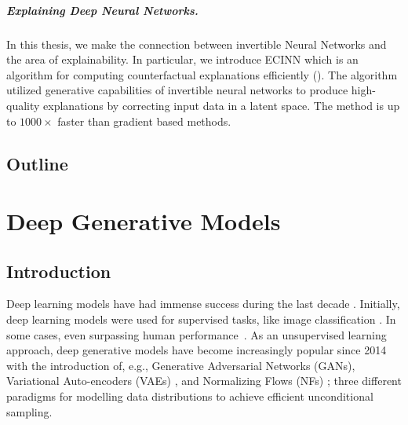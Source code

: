 \paragraph{Explaining Deep Neural Networks.}
In this thesis, we make the connection between invertible Neural Networks and the area of explainability.
In particular, we introduce ECINN which is an algorithm for computing counterfactual explanations efficiently ().
The algorithm utilized generative capabilities of invertible neural networks to produce high-quality explanations by correcting input data in a latent space.
The method is up to $1000\times$ faster than gradient based methods.


\section{Outline}\label{sec:outline}
\chapter{Deep Generative Models}\label{chap:flows}
\section{Introduction} 


Deep learning models have had immense success during the last decade \cite{alexnet, noisyStudent, resnet, vae, gans}. 
Initially, deep learning models were used for supervised tasks, like image classification \cite{alexnet}.
In some cases, even surpassing human performance~\cite{noisyStudent}.
As an unsupervised learning approach, deep generative models have become increasingly popular since 2014 with the introduction of, e.g., Generative Adversarial Networks (GANs)\cite{gans}, Variational Auto-encoders (VAEs) \cite{vae}, and Normalizing Flows (NFs) \cite{nice, rezende2015variational}; three different paradigms for modelling data distributions to achieve efficient unconditional sampling.

